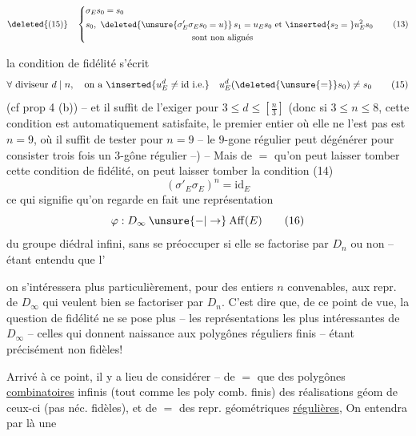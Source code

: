 \[
\deleted{(15)}\quad
\left\{\begin{aligned}
&\sigma_E s_0=s_0\\
&s_0,\ \deleted{\unsure{\sigma'_E\sigma_E s_0=u}}\,s_1=u_E s_0\text{ et }\inserted{s_2={}}u_E^2s_0\\
&\hspace{43mm}\text{sont non alignés}
\end{aligned}\right.\tag*{(13)}
\]

la condition de fidélité s'écrit
\[
\forall\ \text{diviseur }d\mid n,\quad\text{on a }\inserted{u_E^d\ne\mathrm{id}\ \text{i.e.}}\quad u_E^d(\deleted{\unsure{=}}s_0)\ne s_0
\tag*{(15)}
\]
(cf prop 4 (b)) -- et il suffit \inserted{\text{$=$}} de l'exiger pour $3\leq d\leq\left[\frac n3\right]$ (donc si $3\leq n\leq8$, cette condition est automatiquement satisfaite, le premier entier où elle ne l'est pas est $n=9$, où il suffit de  tester pour $n=9$ -- le $9$-gone régulier peut  dégénérer pour consister trois fois un $3$-gône régulier --) -- Mais de $=$ qu'on peut laisser tomber cette condition de fidélité, on peut laisser tomber la  condition (14)
\[
(\sigma'_E\sigma_E)^{n}=\mathrm{id}_E
\]
ce qui signifie qu'on regarde en fait une représentation
\[
\varphi:D_\infty\mathbin{\unsure{-|\to}}\mathrm{Aff}(E)\tag*{(16)}
\]
du groupe diédral infini, sans se préoccuper si elle se factorise par $D_n$ ou non -- étant entendu que l'

on s'intéressera plus particulièrement, pour des entiers $n$ convenables, aux repr. de $D_\infty$ qui veulent bien se factoriser par $D_n$. C'est dire que,  de ce point de vue, la question de fidélité ne se pose plus -- les représentations les plus intéressantes  de $D_\infty$  -- celles qui donnent naissance aux  polygônes réguliers finis -- étant précisément non fidèles!

Arrivé à ce point, il y a lieu de considérer -- de $=$ que des polygônes \uline{combinatoires} infinis  (tout comme les poly comb. finis) des réalisations  géom de ceux-ci (pas néc. fidèles), et de $=$ des repr. géométriques \uline{régulières},     %
 On entendra par là une

